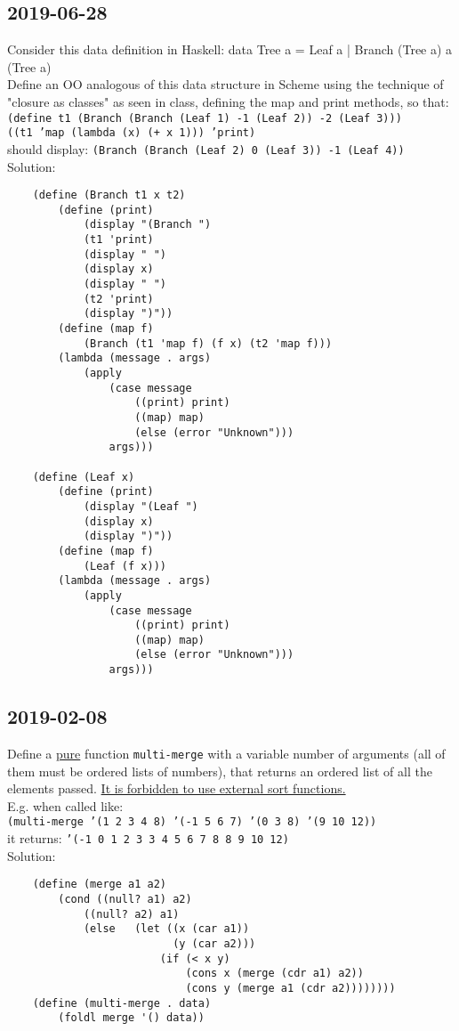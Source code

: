 \subsection{2019-06-28}
Consider this data definition in Haskell: data Tree a = Leaf a | Branch (Tree a) a (Tree a) \\
Define an OO analogous of this data structure in Scheme using the technique of "closure as classes" as seen in class, defining the map and print methods, so that: \\
\texttt{(define t1 (Branch (Branch (Leaf 1) -1 (Leaf 2)) -2 (Leaf 3)))} \\
\texttt{((t1 'map (lambda (x) (+ x 1))) 'print)} \\
should display: \texttt{(Branch (Branch (Leaf 2) 0 (Leaf 3)) -1 (Leaf 4))} \\
Solution:
\begin{lstlisting}
    (define (Branch t1 x t2)
        (define (print)
            (display "(Branch ")
            (t1 'print)
            (display " ")
            (display x)
            (display " ")
            (t2 'print)
            (display ")"))
        (define (map f)
            (Branch (t1 'map f) (f x) (t2 'map f)))
        (lambda (message . args)
            (apply
                (case message
                    ((print) print)
                    ((map) map)
                    (else (error "Unknown")))
                args)))

    (define (Leaf x)
        (define (print)
            (display "(Leaf ")
            (display x)
            (display ")"))
        (define (map f)
            (Leaf (f x)))
        (lambda (message . args)
            (apply
                (case message
                    ((print) print)
                    ((map) map)
                    (else (error "Unknown")))
                args)))
\end{lstlisting}

\subsection{2019-02-08}
Define a \underline{pure} function \texttt{multi-merge} with a variable number of arguments (all of them must be ordered lists of
numbers), that returns an ordered list of all the elements passed. \underline{It is forbidden to use external sort functions.} \\
E.g. when called like: \\
\texttt{(multi-merge '(1 2 3 4 8) '(-1 5 6 7) '(0 3 8) '(9 10 12))} \\
it returns: \texttt{'(-1 0 1 2 3 3 4 5 6 7 8 8 9 10 12)} \\
Solution:
\begin{lstlisting}
    (define (merge a1 a2)
        (cond ((null? a1) a2)
            ((null? a2) a1)
            (else   (let ((x (car a1))
                          (y (car a2)))
                        (if (< x y)
                            (cons x (merge (cdr a1) a2))
                            (cons y (merge a1 (cdr a2))))))))
    (define (multi-merge . data)
        (foldl merge '() data))
\end{lstlisting}

